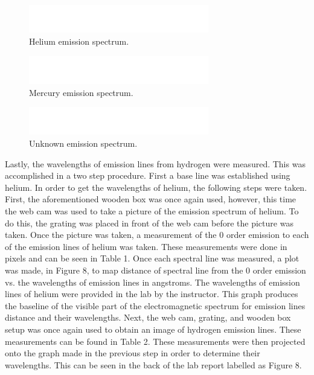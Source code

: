 \documentclass{article}
\begin{document}
\begin{figure}[h]
\centering
\includegraphics[width=0.7\textwidth]{images/BlankSpectrum}
\caption{Helium emission spectrum.\label{fig:cont}}
\end{figure}

\begin{figure}[h]
\centering
\includegraphics[width=0.7\textwidth]{images/BlankSpectrum}
\caption{Mercury emission spectrum.\label{fig:cont}}
\end{figure}

\begin{figure}[h!]
\centering
\includegraphics[width=0.7\textwidth]{images/BlankSpectrum}
\caption{Unknown emission spectrum.\label{fig:cont}}
\end{figure}

Lastly, the wavelengths of emission lines from hydrogen were measured. This was 
accomplished in a two step procedure. First a base line was established using helium.
In order to get the wavelengths of helium, the following steps were taken. First, 
the aforementioned wooden box was once again used, however, this time the web cam was
used to take a picture of the emission spectrum of helium. To do this, the grating was
placed in front of the web cam before the picture was taken. Once the picture was taken,
a measurement of the 0 order emission to each of the emission lines of helium was taken.
These measurements were done in pixels and can be seen in Table 1. 
Once each spectral line was measured, a plot was made, in
Figure 8, to map distance of spectral line from the 0 order emission vs. the wavelengths
of emission lines in angstroms. The wavelengths of emission lines of helium were
provided in the lab by the instructor. This graph produces the baseline of the visible
part of the electromagnetic spectrum for emission lines distance and their wavelengths.
Next, the web cam, grating, and wooden box setup was once again used to obtain an
image of hydrogen emission lines. These measurements can be found in Table 2. These 
measurements were then projected onto the graph
made in the previous step in order to determine their wavelengths. This can be
seen in the back of the lab report labelled as Figure 8.\\
\end{document}
